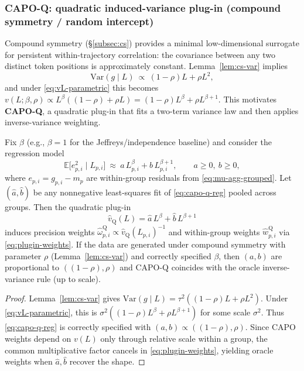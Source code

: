 \subsubsection{CAPO-Q: quadratic induced-variance plug-in (compound symmetry / random intercept)}\label{subsec:capo-q-plugin}
Compound symmetry (\S\ref{subsec:cs}) provides a minimal low-dimensional surrogate for persistent within-trajectory correlation: the covariance between any two distinct token positions is approximately constant. Lemma~\ref{lem:cs-var} implies
\begin{equation}
\label{eq:capo-q-law}
\mathrm{Var}(g\mid L)\ \propto\ (1-\rho)L + \rho L^2,
\end{equation}
and under \eqref{eq:vL-parametric} this becomes $v(L;\beta,\rho)\propto L^{\beta}((1-\rho)+\rho L)= (1-\rho)L^{\beta}+\rho L^{\beta+1}$.
This motivates \textbf{CAPO-Q}, a quadratic plug-in that fits a two-term variance law and then applies inverse-variance weighting.

\begin{proposition}\label{prop:capoq-fit}
Fix $\beta$ (e.g., $\beta=1$ for the Jeffreys/independence baseline) and consider the regression model
\begin{equation}
\label{eq:capo-q-reg}
\mathbb E\big[e_{p,i}^2\mid L_{p,i}\big]\ \approx\ a\,L_{p,i}^{\beta}+b\,L_{p,i}^{\beta+1},\qquad a\ge 0,\ b\ge 0,
\end{equation}
where $e_{p,i}=g_{p,i}-m_p$ are within-group residuals from \eqref{eq:mu-agg-grouped}. Let $(\widehat a,\widehat b)$ be any nonnegative least-squares fit of \eqref{eq:capo-q-reg} pooled across groups. Then the quadratic plug-in
\begin{equation}
\label{eq:capo-q-plugin-v}
\widehat v_{\mathrm{Q}}(L)=\widehat a\,L^{\beta}+\widehat b\,L^{\beta+1}
\end{equation}
induces precision weights $\widehat\omega_{p,i}^{\mathrm{Q}}\propto \widehat v_{\mathrm{Q}}(L_{p,i})^{-1}$ and within-group weights $\widehat w_{p,i}^{\mathrm{Q}}$ via \eqref{eq:plugin-weights}.
If the data are generated under compound symmetry with parameter $\rho$ (Lemma~\ref{lem:cs-var}) and correctly specified $\beta$, then $(a,b)$ are proportional to $((1-\rho),\rho)$ and CAPO-Q coincides with the oracle inverse-variance rule (up to scale).
\end{proposition}
\begin{proof}
Lemma~\ref{lem:cs-var} gives $\mathrm{Var}(g\mid L)=\tau^2((1-\rho)L+\rho L^2)$. Under \eqref{eq:vL-parametric}, this is $\sigma^2((1-\rho)L^{\beta}+\rho L^{\beta+1})$ for some scale $\sigma^2$. Thus \eqref{eq:capo-q-reg} is correctly specified with $(a,b)\propto ((1-\rho),\rho)$. Since CAPO weights depend on $v(L)$ only through relative scale within a group, the common multiplicative factor cancels in \eqref{eq:plugin-weights}, yielding oracle weights when $\widehat a,\widehat b$ recover the shape.
\end{proof}

